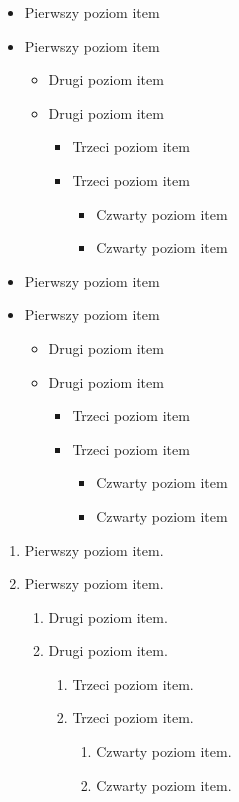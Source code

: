 \documentclass[a4paper,12pt]{article}
\begin{document}
	\begin{itemize}
		\item Pierwszy poziom item
		\item Pierwszy poziom item
		\begin{itemize}
			\item Drugi poziom item
			\item Drugi poziom item
			\begin{itemize}
				\item Trzeci poziom item
				\item Trzeci poziom item
				\begin{itemize}
					\item Czwarty poziom item
					\item Czwarty poziom item
				\end{itemize}
			\end{itemize}
		\end{itemize}
	\end{itemize}
	
	
	\renewcommand{\labelitemi}{$\blacksquare$}
	\renewcommand{\labelitemii}{$\square$}
	\begin{itemize}
		\item Pierwszy poziom item
		\item Pierwszy poziom item
		\begin{itemize}
			\item Drugi poziom item
			\item Drugi poziom item
			\begin{itemize}
				\item Trzeci poziom item
				\item Trzeci poziom item
				\begin{itemize}
					\item Czwarty poziom item
					\item Czwarty poziom item
				\end{itemize}
			\end{itemize}
		\end{itemize}
	\end{itemize}
	
	
	\begin{enumerate}
		\item Pierwszy poziom item.
		\item Pierwszy poziom item.
		\begin{enumerate}
			\item Drugi poziom item.
			\item Drugi poziom item.
			\begin{enumerate}
				\item Trzeci poziom item.
				\item Trzeci poziom item.
				\begin{enumerate}
					\item Czwarty poziom item.
					\item Czwarty poziom item.
				\end{enumerate}
			\end{enumerate}
		\end{enumerate}
	\end{enumerate}
	
\end{document}
